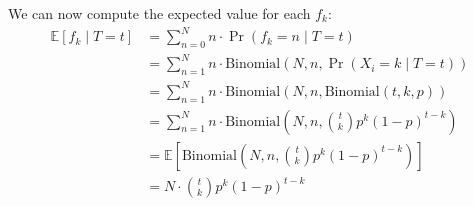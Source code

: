 \documentclass{article}
\newcommand{\stepandtag}{%
  \refstepcounter{equation}%
  \tag{\theequation}%
}
\begin{document}

We can now compute the expected value for each $f_k$:
{
\allowdisplaybreaks
\begin{align*}
    \mathbb{E}\left[ f_k \mid T=t \right] &= \sum_{n=0}^N n \cdot \Pr(f_k = n \mid T=t) \\
    &= \sum_{n=1}^N n \cdot \mathrm{Binomial}(N, n, \Pr(X_i = k \mid T=t)) \\
    &= \sum_{n=1}^N n \cdot \mathrm{Binomial}(N, n, \mathrm{Binomial}(t, k, p)) 
    \\
    &= \sum_{n=1}^N n \cdot \mathrm{Binomial}\left( N, n, \binom{t}{k} p^k {(1-p)}^{t-k} \right) \\
    &= \mathbb{E}\left[ \mathrm{Binomial} \left( N, n, \binom{t}{k} p^k {(1-p)}^{t-k} \right) \right] \\
    &= N \cdot \binom{t}{k} p^k {(1-p)}^{t-k}
\end{align*}
}
\end{document}
